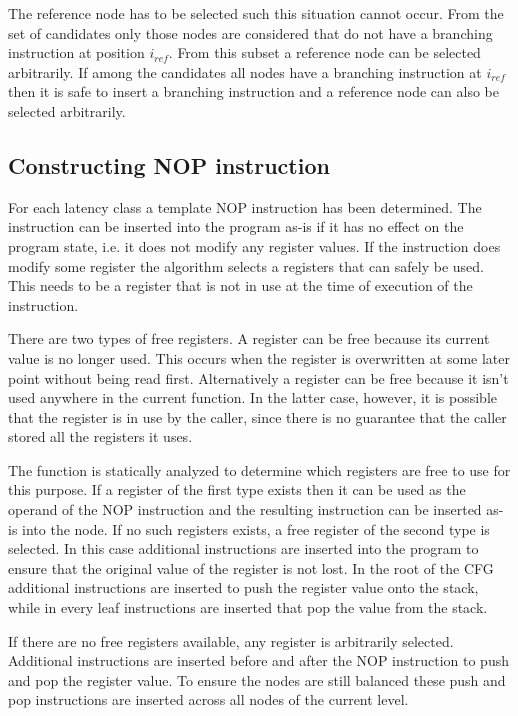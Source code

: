 The reference node has to be selected such this situation cannot occur. From the set of candidates only those nodes are considered that do not have a branching instruction at position $i_{ref}$. 
From this subset a reference node can be selected arbitrarily. If among the candidates all nodes have a branching instruction at $i_{ref}$ then it is safe to insert a branching instruction 
and a reference node can also be selected arbitrarily. 
 
\subsection{Constructing NOP instruction}
For each latency class a template NOP instruction has been determined. 
The instruction can be inserted into the program as-is if it has no effect on the program state, i.e. it does not modify any register values. 
If the instruction does modify some register the algorithm selects a registers that can safely be used. 
This needs to be a register that is not in use at the time of execution of the instruction. 

There are two types of free registers. 
A register can be free because its current value is no longer used. This occurs when the register is overwritten at some later point without being read first. 
Alternatively a register can be free because it isn't used anywhere in the current function. 
In the latter case, however, it is possible that the register is in use by the caller, since there is no guarantee that the caller stored all the registers it uses. 

The function is statically analyzed to determine which registers are free to use for this purpose. 
If a register of the first type exists then it can be used as the operand of the NOP instruction and the resulting instruction 
can be inserted as-is into the node. If no such registers exists, a free register of the second type is selected. 
In this case additional instructions are inserted into the program to ensure that the original value of the register is not lost. 
In the root of the CFG additional instructions are inserted to push the register value onto the stack, while in every leaf instructions are inserted 
that pop the value from the stack. 

If there are no free registers available, any register is arbitrarily selected. Additional instructions are inserted before and after the NOP instruction to push and pop the register value. To ensure the nodes are 
still balanced these push and pop instructions are inserted across all nodes of the current level. 

